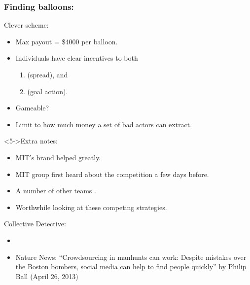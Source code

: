 \begin{frame}
  \frametitle{Finding balloons:}
  
  \begin{block}{Clever scheme:}
    \begin{itemize}
    \item<1-> 
      Max payout = \$4000 per balloon.
    \item<2-> 
      Individuals have clear incentives to both 
      \begin{enumerate}
      \item 
         (spread), and
      \item
         (goal action).
      \end{enumerate}
    \item<3-> Gameable?
    \item<4-> Limit to how much money a set of bad actors can extract.
    \end{itemize}
  \end{block}

  \begin{block}<5->{Extra notes:}
    \begin{itemize}
    \item<5-> 
      MIT's brand helped greatly.
    \item<6-> 
      MIT group first heard about the competition a few days before.
    \item<8-> 
      A number of other teams 
      .
    \item<9-> 
      Worthwhile looking at these competing strategies.\cite{pickard2011a}
    \end{itemize}
  \end{block}

\end{frame}

\begin{frame}

  \begin{block}{Collective Detective:}
    \begin{itemize}
    \item<+->
    \item<+-> 
      Nature News:
      {``Crowdsourcing in manhunts can work:
        Despite mistakes over the Boston bombers, social media can help to find people quickly''}
      by Philip Ball
      (April 26, 2013)
    \end{itemize}
  \end{block}

\end{frame}


